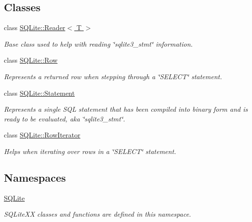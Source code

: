 \subsection*{Classes}
\begin{DoxyCompactItemize}
\item 
class \hyperlink{a00010}{S\-Q\-Lite\-::\-Reader$<$ T $>$}
\begin{DoxyCompactList}\small\item\em Base class used to help with reading \char`\"{}sqlite3\-\_\-stmt\char`\"{} information. \end{DoxyCompactList}\item 
class \hyperlink{a00011}{S\-Q\-Lite\-::\-Row}
\begin{DoxyCompactList}\small\item\em Represents a returned row when stepping through a \char`\"{}\-S\-E\-L\-E\-C\-T\char`\"{} statement. \end{DoxyCompactList}\item 
class \hyperlink{a00013}{S\-Q\-Lite\-::\-Statement}
\begin{DoxyCompactList}\small\item\em Represents a single S\-Q\-L statement that has been compiled into binary form and is ready to be evaluated, aka \char`\"{}sqlite3\-\_\-stmt\char`\"{}. \end{DoxyCompactList}\item 
class \hyperlink{a00012}{S\-Q\-Lite\-::\-Row\-Iterator}
\begin{DoxyCompactList}\small\item\em Helps when iterating over rows in a \char`\"{}\-S\-E\-L\-E\-C\-T\char`\"{} statement. \end{DoxyCompactList}\end{DoxyCompactItemize}
\subsection*{Namespaces}
\begin{DoxyCompactItemize}
\item 
\hyperlink{a00038}{S\-Q\-Lite}
\begin{DoxyCompactList}\small\item\em S\-Q\-Lite\-X\-X classes and functions are defined in this namespace. \end{DoxyCompactList}\end{DoxyCompactItemize}

